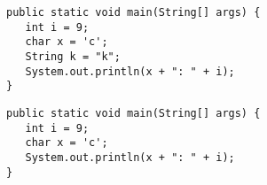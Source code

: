 \documentclass{beamer}
\begin{document}
\begin{frame}[fragile]
\CodeAnimationsNoFadeOut
{}
\begin{verbatim}
public static void main(String[] args) {
   int i = 9;
   char x = 'c';
   String k = "k";
   System.out.println(x + ": " + i);
}
\end{verbatim}
\endAnimateCode
\end{frame}

\begin{frame}[fragile]
\begin{verbatim}
public static void main(String[] args) {
   int i = 9;
   char x = 'c';
   System.out.println(x + ": " + i);
}
\end{verbatim}
\end{frame}
\end{document}
